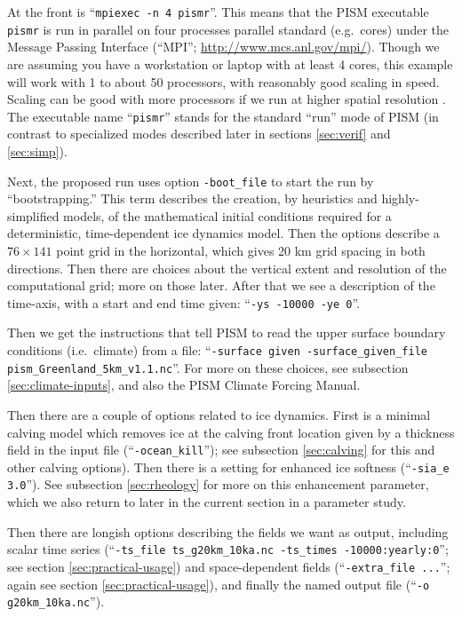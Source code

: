 At the front is ``\texttt{mpiexec -n 4 pismr}''.  This means that the PISM executable \texttt{pismr} is run in parallel on four processes parallel standard (e.g.~cores) under the Message Passing Interface (``MPI''; \url{http://www.mcs.anl.gov/mpi/}).  Though we are assuming you have a workstation or laptop with at least 4 cores, this example will work with 1 to about 50 processors, with reasonably good scaling in speed.  Scaling can be good with more processors if we run at higher spatial resolution \cite{BBssasliding,DickensMorey2013}.  The executable name ``\texttt{pismr}'' stands for the standard ``run'' mode of PISM (in contrast to specialized modes described later in sections \ref{sec:verif} and \ref{sec:simp}).

Next, the proposed run uses option \texttt{-boot_file} to start the run by ``bootstrapping.'' This term describes the creation, by heuristics and highly-simplified models, of the mathematical initial conditions required for a deterministic, time-dependent ice dynamics model.  Then the options describe a $76\times 141$ point grid in the horizontal, which gives 20 km grid spacing in both directions.  Then there are choices about the vertical extent and resolution of the computational grid; more on those later.  After that we see a description of the time-axis, with a start and end time given: ``\texttt{-ys -10000 -ye 0}''.

Then we get the instructions that tell PISM to read the upper surface boundary conditions (i.e.~climate) from a file: ``\texttt{-surface given -surface_given_file pism_Greenland_5km_v1.1.nc}''.  For more on these choices, see subsection \ref{sec:climate-inputs}, and also the PISM Climate Forcing Manual.

Then there are a couple of options related to ice dynamics.  First is a minimal calving model which removes ice at the calving front location given by a thickness field in the input file (``\texttt{-ocean_kill}''); see subsection \ref{sec:calving} for this and other calving options).  Then there is a setting for enhanced ice softness (``\texttt{-sia_e 3.0}'').  See subsection \ref{sec:rheology} for more on this enhancement parameter, which we also return to later in the current section in a parameter study.

Then there are longish options describing the fields we want as output, including scalar time series (``\texttt{-ts_file ts_g20km_10ka.nc -ts_times -10000:yearly:0}''; see section \ref{sec:practical-usage}) and space-dependent fields (``\texttt{-extra_file ...}''; again see section \ref{sec:practical-usage}), and finally the named output file (``\texttt{-o g20km_10ka.nc}'').

